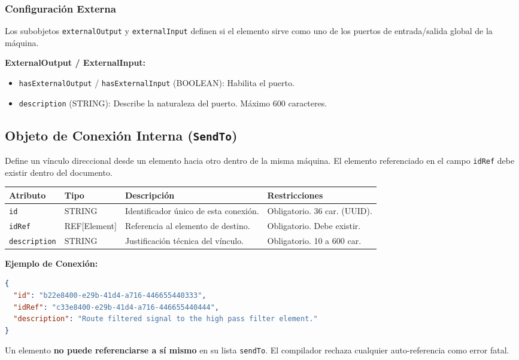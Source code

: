 \subsubsection{Configuración Externa}

Los subobjetos \texttt{externalOutput} y \texttt{externalInput} definen si el elemento sirve como uno de los puertos de entrada/salida global de la máquina.

\textbf{ExternalOutput / ExternalInput:}
\begin{itemize}
    \item \texttt{hasExternalOutput} / \texttt{hasExternalInput} (BOOLEAN): Habilita el puerto.
    \item \texttt{description} (STRING): Describe la naturaleza del puerto. Máximo 600 caracteres.
\end{itemize}

\subsection{Objeto de Conexión Interna (\texttt{SendTo})}

Define un vínculo direccional desde un elemento hacia otro dentro de la misma máquina. El elemento referenciado en el campo \texttt{idRef} debe existir dentro del documento.

\begin{table}[H]
\centering
\small
\begin{tabular}{@{}llp{4cm}l@{}}
\toprule
Atributo & Tipo & Descripción & Restricciones \\ \midrule
\texttt{id} & STRING & Identificador único de esta conexión. & Obligatorio. 36 car. (UUID). \\
\texttt{idRef} & REF[Element] & Referencia al elemento de destino. & Obligatorio. Debe existir. \\
\texttt{description} & STRING & Justificación técnica del vínculo. & Obligatorio. 10 a 600 car. \\ \bottomrule
\end{tabular}
\end{table}

\textbf{Ejemplo de Conexión:}
\begin{lstlisting}[language=json]
{
  "id": "b22e8400-e29b-41d4-a716-446655440333",
  "idRef": "c33e8400-e29b-41d4-a716-446655440444",
  "description": "Route filtered signal to the high pass filter element."
}
\end{lstlisting}

\begin{tcolorbox}[colback=red!5!white,colframe=red!75!black,title=IMPORTANTE]
Un elemento \textbf{no puede referenciarse a sí mismo} en su lista \texttt{sendTo}. El compilador rechaza cualquier auto-referencia como error fatal.
\end{tcolorbox}

